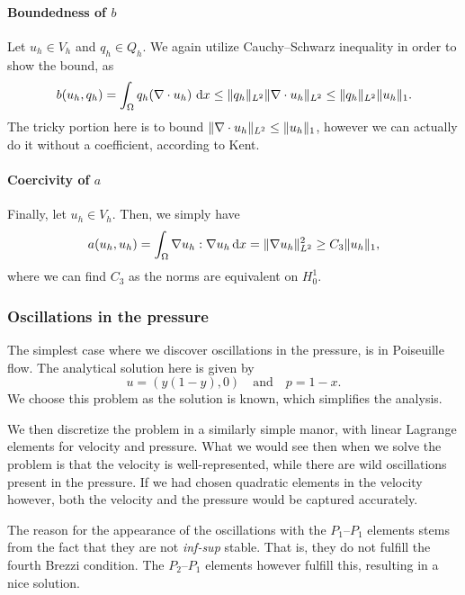 \paragraph{Boundedness of \texorpdfstring{$b$}{b}}
Let $u_h \in V_h$ and $q_h \in Q_h$.
We again utilize Cauchy--Schwarz inequality in order to show the bound, as %
\begin{equation}
    b(u_h, q_h)
    = \int_{\Omega} q_h (\nabla \cdot u_h) \, \mathop{}\!\mathrm{d} x
    \leq \lVert q_h\rVert_{L^2} \lVert\nabla \cdot u_h\rVert_{L^2}
    \leq \lVert q_h\rVert_{L^2} \lVert u_h\rVert_{1}.
\end{equation}
The tricky portion here is to bound $\lVert\nabla \cdot u_h\rVert_{L^2} \leq \lVert u_h\rVert_{1}$, however we can actually do it without a coefficient, according to Kent.

\paragraph{Coercivity of \texorpdfstring{$a$}{a}}
Finally, let $u_h \in V_h$.
Then, we simply have
\begin{equation}
    a(u_h, u_h)
    = \int_{\Omega} \nabla u_h : \nabla u_h \mathop{}\!\mathrm{d} x
    = \lVert\nabla u_h\rVert_{L^2}^2
    \geq C_3 \lVert u_h\rVert_1,
\end{equation}
where we can find $C_3$ as the norms are equivalent on $H^1_0$.

\subsubsection{Oscillations in the pressure}
The simplest case where we discover oscillations in the pressure, is in Poiseuille flow.
The analytical solution here is given by
\begin{equation}
    u = (y(1 - y), 0)
    \quad\text{and}\quad
    p = 1 - x.
\end{equation}
We choose this problem as the solution is known, which simplifies the analysis.

We then discretize the problem in a similarly simple manor, with linear Lagrange elements for velocity and pressure.
What we would see then when we solve the problem is that the velocity is well-represented, while there are wild oscillations present in the pressure.
If we had chosen quadratic elements in the velocity however, both the velocity and the pressure would be captured accurately.

The reason for the appearance of the oscillations with the $P_1$--$P_1$ elements stems from the fact that they are not \textit{inf-sup} stable.
That is, they do not fulfill the fourth Brezzi condition.
The $P_{2}$--$P_{1}$ elements however fulfill this, resulting in a nice solution.

